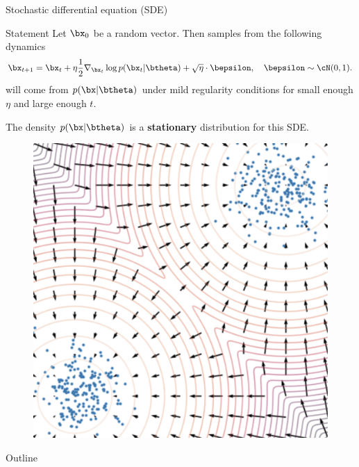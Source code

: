 \begin{frame}{Stochastic differential equation (SDE)}
	\begin{block}{Statement}
		Let $\bx_0$ be a random vector. Then samples from the following dynamics
		\[
			\bx_{t + 1} = \bx_t + \eta \frac{1}{2} \nabla_{\bx_t} \log p(\bx_t | \btheta) + \sqrt{\eta} \cdot \bepsilon, \quad \bepsilon \sim \cN(0, 1).
		\]
		will come from $p(\bx | \btheta)$ under mild regularity conditions for small enough $\eta$ and large enough $t$.
	\end{block}
	\begin{minipage}{0.6\linewidth}
		The density $p(\bx | \btheta)$ is a \textbf{stationary} distribution for this SDE.
	\end{minipage}%
	\begin{minipage}{0.35\linewidth}
		\vspace{-0.2cm}
		\begin{figure}
			\centering
			\includegraphics[width=0.9\linewidth]{figs/langevin_dynamic}
		\end{figure}
	\end{minipage}
	\end{frame}
\begin{frame}{Outline}
	\tableofcontents
\end{frame}
